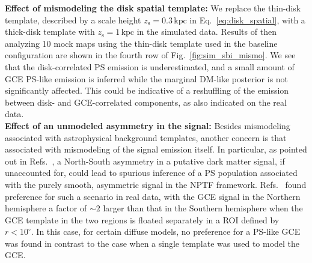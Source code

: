 \documentclass[prd,aps,10pt,nofootinbib,twocolumn,superscriptaddress,preprintnumbers,balancelastpage,longbibliography,floatfix]{revtex4-2}
\begin{document}
\noindent
\textbf{Effect of mismodeling the disk spatial template:} 
We replace the thin-disk template, described by a scale height $z_\mathrm{s} = 0.3\,\mathrm{kpc}$ in Eq.~\eqref{eq:disk_spatial}, with a thick-disk template with $z_\mathrm{s} = 1\,\mathrm{kpc}$ in the simulated data. Results of then analyzing 10 mock maps using the thin-disk template used in the baseline configuration are shown in the fourth row of Fig.~\ref{fig:sim_sbi_mismo}. We see that the disk-correlated PS emission is underestimated, and a small amount of GCE PS-like emission is inferred while the marginal DM-like posterior is not significantly affected. This could be indicative of a reshuffling of the emission between disk- and GCE-correlated components, as also indicated on the real \Fermi data. \\

\noindent
\textbf{Effect of an unmodeled asymmetry in the signal:}
Besides mismodeling associated with astrophysical background templates, another concern is that associated with mismodeling of the signal emission itself. In particular, as pointed out in Refs.~\cite{Leane:2020nmi,Leane:2020pfc}, a North-South asymmetry in a putative dark matter signal, if unaccounted for, could lead to spurious inference of a PS population associated with the purely smooth, asymmetric signal in the NPTF framework. Refs.~\cite{Leane:2020nmi,Leane:2020pfc} found preference for such a scenario in real \Fermi data, with the GCE signal in the Northern hemisphere a factor of $\sim2$ larger than that in the Southern hemisphere when the GCE template in the two regions is floated separately in a ROI defined by $r < 10^\circ$. In this case, for certain diffuse models, no preference for a PS-like GCE was found in contrast to the case when a single template was used to model the GCE. 
\end{document}
